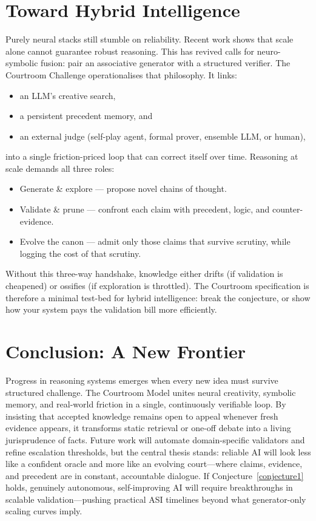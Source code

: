 \documentclass[11pt]{article}
\begin{document}
\section{Toward Hybrid Intelligence}
\label{sec:hybrid-intelligence}
Purely neural stacks still stumble on reliability. Recent work \citep{marcus2020nextdecade, dawid2024latent} shows that scale alone cannot guarantee robust reasoning. This has revived calls for neuro-symbolic fusion: pair an associative generator with a structured verifier. The Courtroom Challenge operationalises that philosophy. It links:
\begin{itemize}
    \item an LLM's creative search,
    \item a persistent precedent memory, and
    \item an external judge (self-play agent, formal prover, ensemble LLM, or human),
\end{itemize}
into a single friction-priced loop that can correct itself over time. Reasoning at scale demands all three roles:
\begin{itemize}
    \item Generate \& explore — propose novel chains of thought.
    \item Validate \& prune — confront each claim with precedent, logic, and counter-evidence.
    \item Evolve the canon — admit only those claims that survive scrutiny, while logging the cost of that scrutiny.
\end{itemize}
Without this three-way handshake, knowledge either drifts (if validation is cheapened) or ossifies (if exploration is throttled). The Courtroom specification is therefore a minimal test-bed for hybrid intelligence: break the conjecture, or show how your system pays the validation bill more efficiently.

\section{Conclusion: A New Frontier}
\label{sec:conclusion}
Progress in reasoning systems emerges when every new idea must survive structured challenge. The Courtroom Model unites neural creativity, symbolic memory, and real-world friction in a single, continuously verifiable loop. By insisting that accepted knowledge remains open to appeal whenever fresh evidence appears, it transforms static retrieval or one-off debate into a living jurisprudence of facts. Future work will automate domain-specific validators and refine escalation thresholds, but the central thesis stands: reliable AI will look less like a confident oracle and more like an evolving court—where claims, evidence, and precedent are in constant, accountable dialogue.
If Conjecture~\ref{conjecture1} holds, genuinely autonomous, self-improving AI will require breakthroughs in scalable validation—pushing practical ASI timelines beyond what generator-only scaling curves imply.
\end{document}
